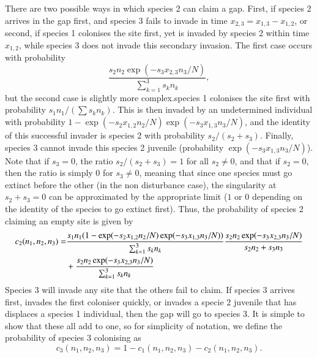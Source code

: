 There are two possible ways in which species 2 can claim a gap. First, if species 2 arrives in the gap first, and species 3 fails to invade in time $x_{2,3}=x_{1,3}-x_{1,2}$, or second, if species 1 colonises the site first, yet is invaded by species 2 within time $x_{1,2}$, while species 3 does not invade this secondary invasion. The first case occurs with probability
$$
\frac{s_2 n_2\exp(-s_3x_{2,3}n_3/N)}{\sum_{k=1}^3 s_k n_k},
$$
but the second case is slightly more complex.species 1 colonises the site first with probability $s_1n_1/(\sum s_kn_k)$. This is then invaded by an undetermined individual with probability $1-\exp(-s_2x_{1,2}n_2/N)\exp(-s_3x_{1,3}n_3/N)$, and the identity of this successful invader is species 2 with probability $s_2/(s_2+s_3)$. Finally, species 3 cannot invade this species 2 juvenile (probability $\exp(-s_3x_{1,3}n_3/N)$). Note that if $s_3=0$, the ratio $s_2/(s_2+s_3)=1$ for all $s_2 \neq 0$, and that if $s_2=0$, then the ratio is simply $0$ for $s_3 \neq0$, meaning that since one species must go extinct before the other (in the non disturbance case), the singularity at $s_2+s_3=0$ can be approximated by the appropriate limit ($1$ or $0$ depending on the identity of the species to go extinct first). Thus, the probability of species 2 claiming an empty site is given by
\begin{align}
\label{c2}
c_2(n_1,n_2,n_3)=&\frac{s_1 n_1(1-\exp(-s_2x_{1,2}n_2/N)\exp(-s_3x_{1,3}n_3/N))}{\sum_{k=1}^3 s_k n_k}\frac{s_2 n_2\exp(-s_3x_{2,3}n_3/N)}{s_2n_2+s_3n_3} \notag \\
&+\frac{s_2 n_2\exp(-s_3x_{2,3}n_3/N)}{\sum_{k=1}^3 s_k n_k}
\end{align}
Species 3 will invade any site that the others fail to claim. If species 3 arrives first, invades the first coloniser quickly, or invades a specie 2 juvenile that has displaces a species 1 individual, then the gap will go to species 3. It is simple to show that these all add to one, so for simplicity of notation, we define the probability of species 3 colonising as
\begin{equation}
\label{c3}
c_3(n_1,n_2,n_3)=1-c_1(n_1,n_2,n_3)-c_2(n_1,n_2,n_3).\end{equation}

